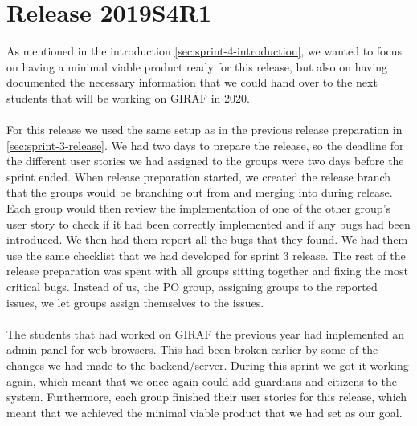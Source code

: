 \section{Release 2019S4R1}
As mentioned in the introduction \autoref{sec:sprint-4-introduction}, we wanted to focus on having a minimal viable product ready for this release, but also on having documented the necessary information that we could hand over to the next students that will be working on GIRAF in 2020.
\\\\
For this release we used the same setup as in the previous release preparation in \autoref{sec:sprint-3-release}. 
We had two days to prepare the release, so the deadline for the different user stories we had assigned to the groups were two days before the sprint ended. When release preparation started, we created the release branch that the groups would be branching out from and merging into during release. Each group would then review the implementation of one of the other group's user story to check if it had been correctly implemented and if any bugs had been introduced. We then had them report all the bugs that they found. We had them use the same checklist that we had developed for sprint 3 release. The rest of the release preparation was spent with all groups sitting together and fixing the most critical bugs. Instead of us, the PO group, assigning groups to the reported issues, we let groups assign themselves to the issues.
\\\\
The students that had worked on GIRAF the previous year had implemented an admin panel for web browsers. This had been broken earlier by some of the changes we had made to the backend/server. During this sprint we got it working again, which meant that we once again could add guardians and citizens to the system. 
Furthermore, each group finished their user stories for this release, which meant that we achieved the minimal viable product that we had set as our goal. 
